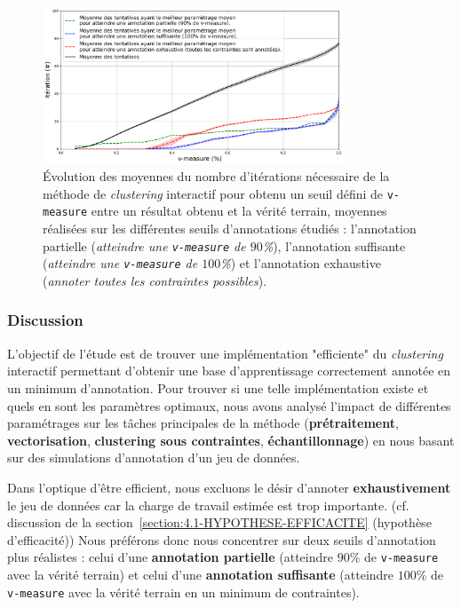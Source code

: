 			\begin{figure}[!htb]
				\centering
				\includegraphics[width=0.8\textwidth]{figures/etude-efficience-evolution-moyenne-5best-par-vmeasure}
				\caption{Évolution des moyennes du nombre d'itérations nécessaire de la méthode de \textit{clustering} interactif pour obtenu un seuil défini de \texttt{v-measure} entre un résultat obtenu et la vérité terrain, moyennes réalisées sur les différentes seuils d'annotations étudiés : l'annotation partielle (\textit{atteindre une \texttt{v-measure} de $90$\%}), l'annotation suffisante (\textit{atteindre une \texttt{v-measure} de $100$\%}) et l'annotation exhaustive (\textit{annoter toutes les contraintes possibles}).}
				\label{figure:4.2.1-ETUDE-OPTIMISATION-EVOLUTION-MEILLEUR-PARAMETRAGE}
			\end{figure}

		\subsubsection{Discussion}

			L'objectif de l'étude est de trouver une implémentation "efficiente" du \textit{clustering} interactif permettant d'obtenir une base d'apprentissage correctement annotée en un minimum d'annotation.
			Pour trouver si une telle implémentation existe et quels en sont les paramètres optimaux, nous avons analysé l'impact de différentes paramétrages sur les tâches principales de la méthode (\textbf{prétraitement}, \textbf{vectorisation}, \textbf{clustering sous contraintes}, \textbf{échantillonnage}) en nous basant sur des simulations d'annotation d'un jeu de données.
			
			Dans l'optique d'être efficient, nous excluons le désir d'annoter \textbf{exhaustivement} le jeu de données car la charge de travail estimée est trop importante.
			(cf. discussion de la section~\ref{section:4.1-HYPOTHESE-EFFICACITE} (hypothèse d'efficacité))
			Nous préférons donc nous concentrer sur deux seuils d'annotation plus réalistes : celui d'une \textbf{annotation partielle} (atteindre $90$\% de \texttt{v-measure} avec la vérité terrain) et celui d'une \textbf{annotation suffisante} (atteindre $100$\% de \texttt{v-measure} avec la vérité terrain en un minimum de contraintes). 
			
